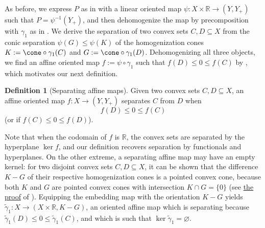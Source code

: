 \documentclass{article}
\theoremstyle{plain}
\theoremstyle{definition}
\newtheorem{definition}[definition]{Definition}
\theoremstyle{remark}
\begin{document}
As before, we express $P$ as in  with a linear oriented map $\psi:X \times \mathbb{R} \to (Y, Y_+)$ such that $P = \psi^{-1}(Y_+)$, and then dehomogenize the map by precomposition with $\gamma_1$ as in . We derive the separation of two convex sets
$C,  D \subseteq X$ from the conic separation $\psi(G) \le \psi(K)$ of the
homogenization cones $K := \cone \circ\gamma_1(C)$ and $G := \cone \circ \gamma_1(D)$. 
Dehomogenizing  all three objects, we find an affine oriented map $f := \psi \circ \gamma_1$ such that
$f(D) \le 0 \le f(C)$ by , which motivates our next definition.
\begin{definition}[Separating affine maps]
\label{loc:separating_affine_maps.statement}
Given two convex sets $C, D \subseteq X$, an affine oriented map
$f:X \to (Y, Y_+)$ separates $C$ from $D$ when
\begin{equation*}
f(D) \le 0 \le f(C)
\end{equation*}
(or if $f(C) \le 0 \le f(D)$).
\end{definition}
Note that when the codomain of $f$ is $\mathbb{R}$, the convex sets are separated by the hyperplane $\ker f$, and our definition recovers separation by functionals and hyperplanes.
On the other extreme, a separating affine map may have an empty kernel: for two disjoint convex sets $C, D \subseteq X$, it can be shown that the difference $K - G$ of their respective homogenization cones is a pointed convex cone, because both $K$ and $G$ are pointed convex cones with intersection $K \cap G = \{ 0 \}$ (see \hyperlink{loc:generated_faces_are_formed_by_symmetric_differences.proof}{the proof} of ). Equipping the embedding map with the orientation $K-G$ yields $\tilde{\gamma}_1:X \to (X \times \mathbb{R}, K-G)$, an oriented affine map which is separating because $\tilde{\gamma}_1(D)\le 0 \le \tilde{\gamma}_1(C)$, and which is such that $\ker \tilde{\gamma}_1 = \varnothing$.
\end{document}
